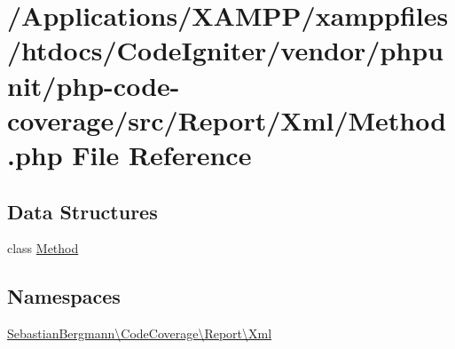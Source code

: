 \hypertarget{phpunit_2php-code-coverage_2src_2_report_2_xml_2_method_8php}{}\section{/\+Applications/\+X\+A\+M\+P\+P/xamppfiles/htdocs/\+Code\+Igniter/vendor/phpunit/php-\/code-\/coverage/src/\+Report/\+Xml/\+Method.php File Reference}
\label{phpunit_2php-code-coverage_2src_2_report_2_xml_2_method_8php}
\subsection*{Data Structures}
\begin{DoxyCompactItemize}
\item 
class \mbox{\hyperlink{class_sebastian_bergmann_1_1_code_coverage_1_1_report_1_1_xml_1_1_method}{Method}}
\end{DoxyCompactItemize}
\subsection*{Namespaces}
\begin{DoxyCompactItemize}
\item 
 \mbox{\hyperlink{namespace_sebastian_bergmann_1_1_code_coverage_1_1_report_1_1_xml}{Sebastian\+Bergmann\textbackslash{}\+Code\+Coverage\textbackslash{}\+Report\textbackslash{}\+Xml}}
\end{DoxyCompactItemize}
